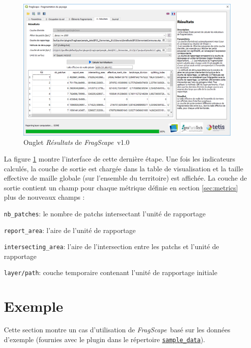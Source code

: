 \documentclass[11pt]{article}
\newcommand{\source}[1]{\vspace*{-0.4cm}\caption*{\textit{Source: {#1}}}}
\newcommand{\tool}{\emph{FragScape}}
\let\tempone\itemize
\let\temptwo\enditemize
\renewenvironment{itemize}{\tempone\addtolength{\itemsep}{-0.5\baselineskip}}{\temptwo}
\begin{document}
\begin{figure}[h!]
    \centering
    \includegraphics[scale=0.6]{pictures/resultsTabFr.png}
    \caption{Onglet \textit{Résultats} de \tool\ v1.0}
    \label{fig:resultsTab}
\end{figure}


La figure \ref{fig:resultsTab} montre l'interface de cette dernière étape.
Une fois les indicateurs calculés, la couche de sortie est chargée dans la table de visualisation et la taille effective de maille globale (sur l'ensemble du territoire) est affichée.
La couche de sortie contient un champ pour chaque métrique définie en section \ref{sec:metrics} plus de nouveaux champs :
\begin{itemize}
    \item \texttt{nb\_patches}: le nombre de patchs intersectant l'unité de rapportage
    \item \texttt{report\_area}: l'aire de l'unité de rapportage
    \item \texttt{intersecting\_area}: l'aire de l'intersection entre les patchs et l'unité de rapportage
    \item \texttt{layer/path}: couche temporaire contenant l'unité de rapportage initiale
\end{itemize}

\pagebreak

\section{Exemple}

Cette section montre un cas d'utilisation de \tool\ basé sur les données d'exemple (fournies avec le plugin dans le répertoire \href{https://github.com/MathieuChailloux/FragScape/tree/master/sample_data/EPCI_Clermontais_2012}{\texttt{sample\_data}}).
\end{document}
